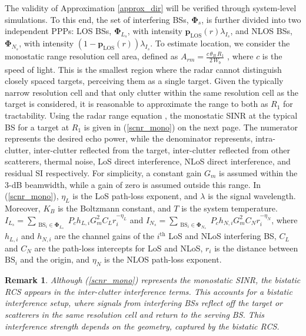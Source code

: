 \documentclass[journal]{IEEEtran}
\newtheorem{remark}{\textbf{Remark}}
\begin{document}
The validity of Approximation \ref{approx_dir} will be verified through system-level simulations. To this end, the set of interfering BSs, \(\boldsymbol{\Phi}_{s}\), is further divided into two independent PPPs: LOS BSs, \(\boldsymbol{\Phi}_{L_s}\), with intensity \(\boldsymbol{p}_{\text{LOS}}(r) \lambda_{I_s}\), and NLOS BSs, \(\boldsymbol{\Phi}_{N_s}\), with intensity \((1 - \boldsymbol{p}_{\text{LOS}}(r)) \lambda_{I_s}\). 
To estimate location, we consider the monostatic range resolution cell area, defined as \( A_{rm} = \frac{c \, \theta_B \, R_1}{2 \, W_b} \) \cite{barton2004radar}, where \( c \) is the speed of light. 
This is the smallest region where the radar cannot distinguish closely spaced targets, perceiving them as a single target.
Given the typically narrow resolution cell \cite{barton2004radar} and that only clutter within the same resolution cell as the target is considered, it is reasonable to approximate the range to both as \( R_1 \) for tractability.
Using the radar range equation \cite{barton2004radar}, the monostatic SINR at the typical BS for a target at \( R_1 \) is given in (\ref{scnr_mono}) on the next page. The numerator represents the desired echo power, while the denominator represents, intra-clutter, inter-clutter reflected from the target, inter-clutter reflected from other scatterers, thermal noise, LoS direct interference, NLoS direct interference, and residual SI respectively.
For simplicity, a constant gain \( G_m \) is assumed within the 3-dB beamwidth, while a gain of zero is assumed outside this range.
In (\ref{scnr_mono}), \(\eta_L\) is the LoS path-loss exponent, and \(\lambda\) is the signal wavelength.  Moreover, \(K_B\) is the Boltzmann constant, and \(T\) is the system temperature.
\(I_{L_s} = \sum\limits_{\substack{\text{BS}_i \in \boldsymbol{\Phi}_{L_s}}} P_c h_{L,i} G_m^2 C_L r_i^{-\eta_L}\) and \(I_{N_s} = \sum\limits_{\substack{\text{BS}_i \in \boldsymbol{\Phi}_{N_s}}} P_c h_{N,i} G_m^2 C_N r_i^{-\eta_N}\), where \(h_{L,i}\) and \(h_{N,i}\) are the channel gains of the \(i^{\text{th}}\) LoS and NLoS interfering BS, \(C_L\) and \(C_N\) are the path-loss intercepts for LoS and NLoS,  \(r_i\) is the distance between \(\text{BS}_i\) and the origin, and $\eta_N$ is the  NLOS path-loss exponent.
\begin{remark}
Although (\ref{scnr_mono}) represents the monostatic SINR, the bistatic RCS appears in the inter-clutter interference terms. This accounts for a bistatic interference setup, where signals from interfering BSs reflect off the target or scatterers in the same resolution cell and return to the serving BS. This interference strength depends on the geometry, captured by the bistatic RCS.
\end{remark}
\end{document}
